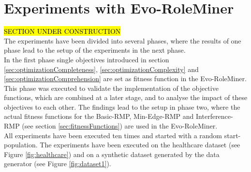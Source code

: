 
\newpage
\section{Experiments with Evo-RoleMiner}
\hl{SECTION UNDER CONSTRUCTION}\\
The experiments have been divided into several phases, where the results of one phase lead to the setup of the experiments in the next phase.\\
In the first phase single objectives introduced in section \ref{sec:optimizationCompleteness}, \ref{sec:optimizationComplexity} and \ref{sec:optimizationComprehension} are set as fitness function in the Evo-RoleMiner. This phase was executed to validate the implementation of the objective functions, which are combined at a later stage, and to analyse the impact of these objectives to each other. The findings lead to the setup in phase two, where the actual fitness functions for the Basic-RMP, Min-Edge-RMP and Interference-RMP (see section \ref{sec:fitnessFunctions}) are used in the Evo-RoleMiner.\\
All experiments have been executed ten times and started with a random start-population. The experiments have been executed on the healthcare dataset (see Figure \ref{fig:healthcare}) and on a synthetic dataset generated by the data generator (see Figure \ref{fig:dataset1}).

